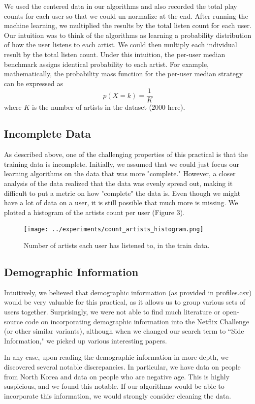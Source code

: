 \documentclass[10pt]{article}
\begin{document}
We used the centered data in our algorithms and also recorded the total play counts for each user so that we could un-normalize at the end. After running the machine learning, we multiplied the results by the total listen count for each user. Our intuition was to think of the algorithms as learning a probability distribution of how the user listens to each artist. We could then multiply each individual result by the total listen count. Under this intuition, the per-user median benchmark assigns identical probability to each artist. For example, mathematically, the probability mass function for the per-user median strategy can be expressed as
$$p(X = k) = \frac{1}{K}$$
where $K$ is the number of artists in the dataset ($2000$ here).  

\subsection{Incomplete Data}
As described above, one of the challenging properties of this practical is that the training data is incomplete. Initially, we assumed that we could just focus our learning algorithms on the data that was more "complete." However, a closer analysis of the data realized that the data was evenly spread out, making it difficult to put a metric on how "complete" the data is. Even though we might have a lot of data on a user, it is still possible that much more is missing. We plotted a histogram of the artists count per user (Figure 3).

\begin{figure}[h]
\centering
\texttt{[image: ../experiments/count\_artists\_histogram.png]}
\caption{Number of artists each user has listened to, in the train data.}
\label{fig:img3}
\end{figure}

\subsection{Demographic Information}
Intuitively, we believed that demographic information (as provided in profiles.csv) would be very valuable for this practical, as it allows us to group various sets of users together. Surprisingly, we were not able to find much literature or open-source code on incorporating demographic information into the Netflix Challenge (or other similar variants), although when we changed our search term to ``Side Information," we picked up various interesting papers.

In any case, upon reading the demographic information in more depth, we discovered several notable discrepancies. In particular, we have data on people from North Korea and data on people who are negative age. This is highly suspicious, and we found this notable. If our algorithms would be able to incorporate this information, we would strongly consider cleaning the data.
\end{document}
